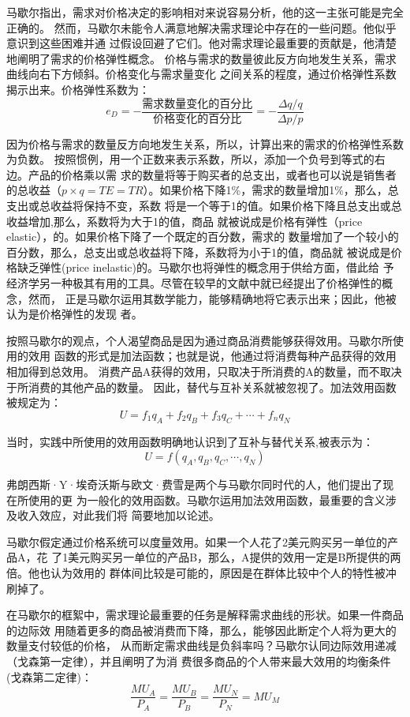 马歇尔指出，需求对价格决定的影响相对来说容易分析，他的这一主张可能是完全正确的。
然而，马歇尔未能令人满意地解决需求理论中存在的一些问题。他似乎意识到这些困难并通
过假设回避了它们。他对需求理论最重要的贡献是，他清楚地阐明了需求的价格弹性概念。
价格与需求的数量彼此反方向地发生关系，需求曲线向右下方倾斜。价格变化与需求量变化
之间关系的程度，通过价格弹性系数揭示出来。价格弹性系数为：
\[e_D = - \frac{需求数量变化的百分比}{价格变化的百分比} = - \frac{\Delta
    q/q}{\Delta p /p}\]

因为价格与需求的数量反方向地发生关系，所以，计算出来的需求的价格弹性系数为负数。
按照惯例，用一个正数来表示系数，所以，添加一个负号到等式的右边。产品的价格乘以需
求的数量将等于购买者的总支出，或者也可以说是销售者的总收益（$p \times q = TE
=TR$）。如果价格下降1\%，需求的数量增加1\%，那么，总支出或总收益将保持不变，系数
将是一个等于1的值。如果价格下降且总支出或总收益增加,那么，系数将为大于1的值，商品
就被说成是价格有弹性（price elastic），的。如果价格下降了一个既定的百分数，需求的
数量增加了一个较小的百分数，那么，总支出或总收益将下降，系数将为小于1的值，商品就
被说成是价格缺乏弹性(price inelastic)的。马歇尔也将弹性的概念用于供给方面，借此给
予经济学另一种极其有用的工具。尽管在较早的文献中就已经提出了价格弹性的概念，然而，
正是马歇尔运用其数学能力，能够精确地将它表示出来；因此，他被认为是价格弹性的发现
者。

按照马歇尔的观点，个人渴望商品是因为通过商品消费能够获得效用。马歇尔所使用的效用
函数的形式是加法函数；也就是说，他通过将消费每种产品获得的效用相加得到总效用。
消费产品A获得的效用，只取决于所消费的A的数量，而不取决于所消费的其他产品的数量。
因此，替代与互补关系就被忽视了。加法效用函数被规定为：
\[U = f_1q_A + f_2q_B + f_3q_C + \cdots + f_nq_N\]

当时，实践中所使用的效用函数明确地认识到了互补与替代关系,被表示为：
\[U = f(q_A, q_B, q_C, \cdots, q_N)\]

弗朗西斯·Y·埃奇沃斯与欧文·费雪是两个与马歇尔同时代的人，他们提出了现在所使用的更
为一般化的效用函数。马歇尔运用加法效用函数，最重要的含义涉及收入效应，对此我们将
简要地加以论述。

马歇尔假定通过价格系统可以度量效用。如果一个人花了2美元购买另一单位的产品A，花
了1美元购买另一单位的产品B，那么，A提供的效用一定是B所提供的两倍。他也认为效用的
群体间比较是可能的，原因是在群体比较中个人的特性被冲刷掉了。

在马歇尔的框絮中，需求理论最重要的任务是解释需求曲线的形状。如果一件商品的边际效
用随着更多的商品被消费而下降，那么，能够因此断定个人将为更大的数量支付较低的价格，
从而断定需求曲线是负斜率吗？马歇尔认同边际效用递减（戈森第一定律），并且阐明了为消
费很多商品的个人带来最大效用的均衡条件(戈森第二定律)：
\begin{equation}
  \label{eq:1}
  \frac{MU_A}{P_A} = \frac{MU_B}{P_B} = \frac{MU_N}{P_N} =MU_M
\end{equation}

